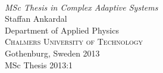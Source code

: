\begin{titlepage}

\mbox{}
\vfill
\addtolength{\voffset}{2cm}
\begin{flushleft}
	{ \\[0.5cm]
	\emph{\Large MSc Thesis in Complex Adaptive Systems} \\[.8cm]
	
	{\huge Staffan Ankardal}\\[.8cm]
	
	{\Large Department of Applied Physics\\
	\textsc{Chalmers University of Technology} \\
	Gothenburg, Sweden 2013 \\
	MSc Thesis 2013:1\\
	} 
	}
\end{flushleft}

\end{titlepage}
\ClearShipoutPicture

